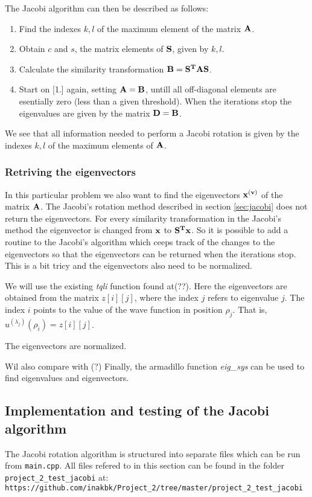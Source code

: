 \documentclass[11pt,a4wide]{article}
\begin{document}
The Jacobi algorithm can then be described as follows: 
\begin{enumerate}
\item Find the indexes $k, l$ of the maximum element of the matrix $\bf A$.
\item Obtain $c$ and $s$, the matrix elements of $\bf S$, given by $k, l$.
\item Calculate the similarity transformation $\bf{B = S^TAS}$.
\item Start on [1.] again, setting $\bf {A = B}$, untill all off-diagonal elements are esentially zero (less than a given threshold). When the iterations stop the eigenvalues are given by the matrix $\bf {D = B}$.
\end{enumerate}

We see that all information needed to perform a Jacobi rotation is given by the indexes $k, l$ of the maximum elements of $\bf A$.

\subsubsection*{Retriving the eigenvectors}
In this particular problem we also want to find the eigenvectors $\bf x^{(v)}$ of the matrix $\bf A$. The Jacobi's rotation method described in section \ref{sec:jacobi} does not return the eigenvectors. For every similarity transformation in the Jacobi's method the eigenvector is changed from $\bf x$ to $\bf{S^Tx}$. So it is possible to add a routine to the Jacobi's algorithm which ceeps track of the changes to the eigenvectors so that the eigenvectors can be returned when the iterations stop. This is a bit tricy and the eigenvectors also need to be normalized.

We will use the existing {\em tqli} function found at(??). Here the eigenvectors are obtained from the matrix $z[i][j]$, where the index $j$ refers to eigenvalue $j$. The index $i$ points to the value of the wave function in position $\rho_j$. That is,  $u^{(\lambda_j)}(\rho_i)=z[i][j]$.   

The eigenvectors are normalized. 

Wil also compare with (?)
Finally, the armadillo function {\em eig\_sys} can be used to find eigenvalues and eigenvectors.

\subsection{Implementation and testing of the Jacobi algorithm} \label{sec: test_jacobi}
The Jacobi rotation algorithm is structured into separate files which can be run from \texttt{main.cpp}. All files refered to in this section can be found in the folder \texttt{project\_2\_test\_jacobi} at: \\
\texttt{https://github.com/inakbk/Project\_2/tree/master/project\_2\_test\_jacobi}
\end{document}
